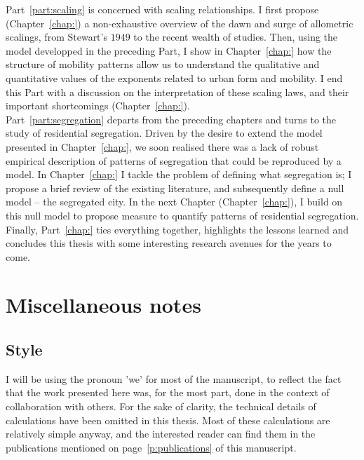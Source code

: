 Part~\ref{part:scaling} is concerned with scaling relationships. I first propose
(Chapter~\ref{chap:}) a non-exhaustive overview of the dawn and surge of
allometric scalings, from Stewart's $1949$ to the recent wealth of studies. Then,
using the model developped in the preceding Part, I show in Chapter~\ref{chap:}
how the structure of mobility patterns allow us to understand the qualitative
and quantitative values of the exponents related to urban form and mobility. I
end this Part with a discussion on the interpretation of these scaling laws, and
their important shortcomings (Chapter~\ref{chap:}).\\

Part~\ref{part:segregation} departs from the preceding chapters and turns to the
study of residential segregation. Driven by the desire to extend the model
presented in Chapter~\ref{chap:}, we soon realised there was a lack of robust
empirical description of patterns of segregation that could be reproduced by a
model. In Chapter~\ref{chap:} I tackle the problem of defining what segregation
is; I propose a brief review of the existing literature, and subsequently define
a null model -- the segregated city. In the next Chapter (Chapter~\ref{chap:}),
I build on this null model to propose measure to quantify patterns of
residential segregation.\\

Finally, Part~\ref{chap:} ties everything together, highlights the lessons
learned and concludes this thesis with some interesting research avenues for the
years to come.



\section{Miscellaneous notes}

\subsection{Style}
\label{sub:style}

I will be using the pronoun 'we' for most of the manuscript, to reflect the fact
that the work presented here was, for the most part, done in the context of
collaboration with others. For the sake of clarity, the technical details of
calculations have been omitted in this thesis. Most of these calculations are
relatively simple anyway, and the interested reader can find them in the
publications mentioned on page~\ref{p:publications} of this manuscript.


